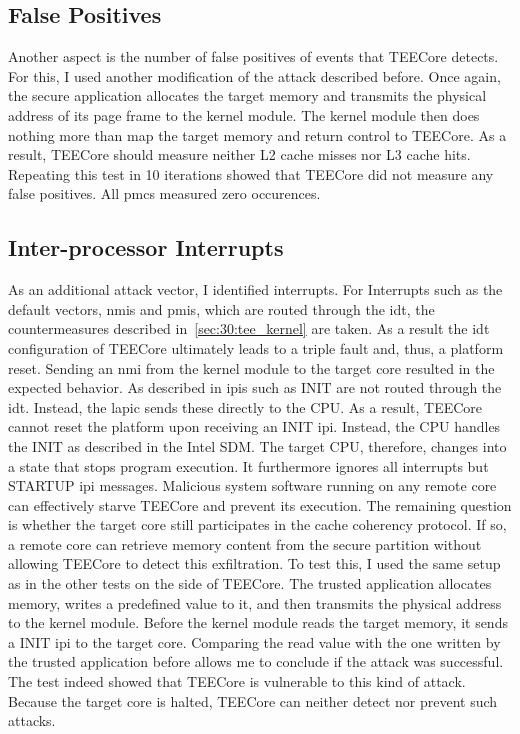 \subsection{False Positives}
\label{sec:evaluation:fp}
Another aspect is the number of false positives of events that TEECore detects.
For this, I used another modification of the attack described before. Once
again, the secure application allocates the target memory and transmits the
physical address of its page frame to the kernel module. The kernel module then
does nothing more than map the target memory and return control to TEECore. As a
result, TEECore should measure neither L2 cache misses nor L3 cache hits.
Repeating this test in 10 iterations showed that TEECore did not measure any
false positives. All \glspl{pmc} measured zero occurences.\\

\subsection{Inter-processor Interrupts}
\label{sec:evaluation:ipi}
As an additional attack vector, I identified interrupts. For Interrupts such as
the default vectors, \glspl{nmi} and \glspl{pmi}, which are routed through the
\gls{idt}, the countermeasures described in~\ref{sec:30:tee_kernel} are taken.
As a result the \gls{idt} configuration of TEECore ultimately leads to a triple
fault and, thus, a platform reset. Sending an \gls{nmi} from the kernel module
to the target core resulted in the expected behavior. As described in
 \glspl{ipi} such as INIT are not routed through the \gls{idt}.
Instead, the \gls{lapic} sends these directly to the CPU. As a result, TEECore
cannot reset the platform upon receiving an INIT \gls{ipi}. Instead, the CPU
handles the INIT as described in the Intel SDM. The target CPU, therefore,
changes into a state that stops program execution. It furthermore ignores all
interrupts but STARTUP \gls{ipi} messages. Malicious system software running on
any remote core can effectively starve TEECore and prevent its execution. The
remaining question is whether the target core still participates in the cache
coherency protocol. If so, a remote core can retrieve memory content from the
secure partition without allowing TEECore to detect this exfiltration. To test
this, I used the same setup as in the other tests on the side of TEECore. The
trusted application allocates memory, writes a predefined value to it, and then
transmits the physical address to the kernel module. Before the kernel module
reads the target memory, it sends a INIT \gls{ipi} to the target core. Comparing
the read value with the one written by the trusted application before allows me
to conclude if the attack was successful. The test indeed showed that TEECore is
vulnerable to this kind of attack. Because the target core is halted, TEECore
can neither detect nor prevent such attacks.

